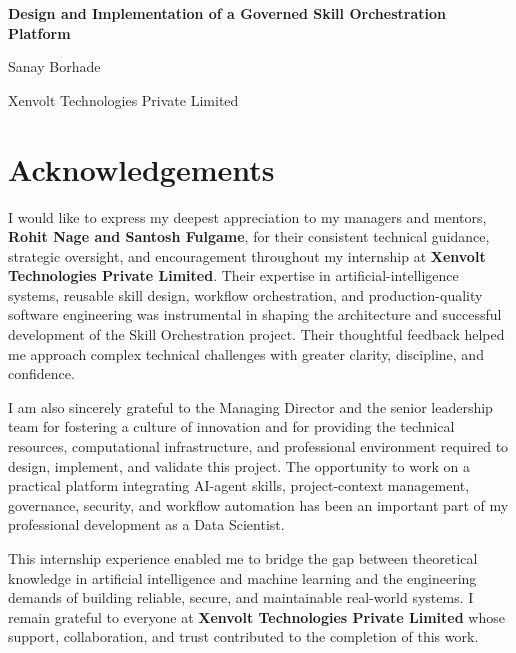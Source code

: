 \documentclass[12pt]{report}
\newenvironment{acknowledgements}{\chapter*{Acknowledgements}\addcontentsline{toc}{chapter}{Acknowledgements}}{}
\begin{document}
\begin{titlepage}
\centering
\vspace*{2cm}
{\LARGE \bfseries Design and Implementation of a Governed Skill Orchestration Platform \par}
\vspace{2cm}
{\Large Sanay Borhade \par}
\vspace{1.5cm}
{\large Xenvolt Technologies Private Limited \par}
\vfill
\end{titlepage}

\begin{acknowledgements}
I would like to express my deepest appreciation to my managers and mentors, \textbf{Rohit Nage and Santosh Fulgame}, for their consistent technical guidance, strategic oversight, and encouragement throughout my internship at \textbf{Xenvolt Technologies Private Limited}. Their expertise in artificial-intelligence systems, reusable skill design, workflow orchestration, and production-quality software engineering was instrumental in shaping the architecture and successful development of the Skill Orchestration project. Their thoughtful feedback helped me approach complex technical challenges with greater clarity, discipline, and confidence.

I am also sincerely grateful to the Managing Director and the senior leadership team for fostering a culture of innovation and for providing the technical resources, computational infrastructure, and professional environment required to design, implement, and validate this project. The opportunity to work on a practical platform integrating AI-agent skills, project-context management, governance, security, and workflow automation has been an important part of my professional development as a Data Scientist.

This internship experience enabled me to bridge the gap between theoretical knowledge in artificial intelligence and machine learning and the engineering demands of building reliable, secure, and maintainable real-world systems. I remain grateful to everyone at \textbf{Xenvolt Technologies Private Limited} whose support, collaboration, and trust contributed to the completion of this work.
\end{acknowledgements}
\end{document}
